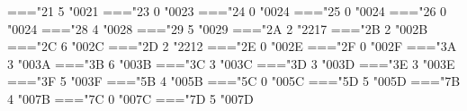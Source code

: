 
\newcount \charcount
\newcount \charno
\newcount \mathcharatomtype
\newcount \mathcharno

\def \setregmathcode {%
  \Umathcode\charno \mathcharatomtype\z@\mathcharno \relax}

\def \bulksetmathcode {%
  \ifnum \charcount>\z@
    \setregmathcode
    \advance\charcount\m@ne
    \advance\charno\@ne
    \advance\mathcharno\@ne
    \bulksetmathcode
  \fi}

\def \setmathchar {\afterassignment\setmathchar@A \charno=}
\def \setmathchar@A {\afterassignment\setregmathcode \mathcharno=}

\def \definemathchar #1{%
  \def\@mathcharname{#1}%
  \afterassignment\definemathcharA \mathcharatomtype=}
\def \definemathcharA {%
  \afterassignment\definemathcharB \mathcharno=}
\def \definemathcharB {%
  \expandafter\Umathchardef \@mathcharname
  \mathcharatomtype\z@\mathcharno \relax}

\def \setmathcode {\afterassignment\setmathcode@A \charno=}
\def \setmathcode@A {\afterassignment\setmathcode@B \mathcharatomtype=}
\def \setmathcode@B {\afterassignment\setregmathcode \mathcharno=}

\def \setdelcode {\afterassignment\setdelcode@A \charno=}
\def \setdelcode@A {\afterassignment\regsetdelcode \mathcharno=}

\def \regsetdelcode {\Udelcode\charno \z@\mathcharno}



\setmathcode "21  5 "0021 %
\setmathcode "23  0 "0023 %
\setmathcode "24  0 "0024 %
\setmathcode "25  0 "0024 %
\setmathcode "26  0 "0024 %
\setmathcode "28  4 "0028 %
\setmathcode "29  5 "0029 %
\setmathcode "2A  2 "2217 %
\setmathcode "2B  2 "002B %
\setmathcode "2C  6 "002C %
\setmathcode "2D  2 "2212 %
\setmathcode "2E  0 "002E %
\setmathcode "2F  0 "002F %
\setmathcode "3A  3 "003A %
\setmathcode "3B  6 "003B %
\setmathcode "3C  3 "003C %
\setmathcode "3D  3 "003D %
\setmathcode "3E  3 "003E %
\setmathcode "3F  5 "003F %
\setmathcode "5B  4 "005B %
\setmathcode "5C  0 "005C %
\setmathcode "5D  5 "005D %
\setmathcode "7B  4 "007B %
\setmathcode "7C  0 "007C %
\setmathcode "7D  5 "007D %


